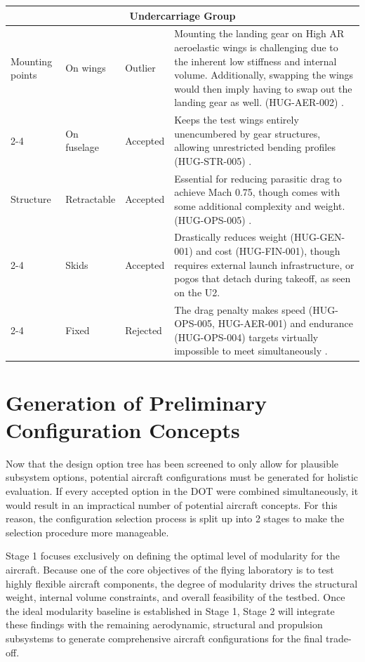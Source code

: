 \begin{longtable}{|p{1.6cm}|p{2.3cm}|p{1.6cm}|p{9.5cm}|}
\multicolumn{4}{|c|}{\textbf{Undercarriage Group}} \\
\hline
Mounting points & On wings & Outlier &  Mounting the landing gear on High AR aeroelastic wings is challenging due to the inherent low stiffness and internal volume. Additionally, swapping the wings would then imply having to swap out the landing gear as well. (HUG-AER-002) \cite{raymer1992aircraft}. \\
\cline{2-4}
\multicolumn{1}{|l|}{} & On fuselage & Accepted & Keeps the test wings entirely unencumbered by gear structures, allowing unrestricted bending profiles (HUG-STR-005) \cite{Vos}. \\
\hline
Structure & Retractable & Accepted & Essential for reducing parasitic drag to achieve Mach 0.75, though comes with some additional complexity and weight. (HUG-OPS-005) \cite{raymer1992aircraft}. \\
\cline{2-4}
\multicolumn{1}{|l|}{} & Skids & Accepted & Drastically reduces weight (HUG-GEN-001) and cost (HUG-FIN-001), though requires external launch infrastructure, or pogos that detach during takeoff, as seen on the U2. \cite{AirforceTechU2}\\
\cline{2-4}
\multicolumn{1}{|l|}{} & Fixed & Rejected & The drag penalty makes speed (HUG-OPS-005, HUG-AER-001) and endurance (HUG-OPS-004) targets virtually impossible to meet simultaneously \cite{raymer1992aircraft}. \\
\hline
\end{longtable}

\section{Generation of Preliminary Configuration Concepts}
\label{sec:prelim_config_concepts}

Now that the design option tree has been screened to only allow for plausible subsystem options, potential aircraft configurations must be generated for holistic evaluation. If every accepted option in the DOT were combined simultaneously, it would result in an impractical number of potential aircraft concepts. For this reason, the configuration selection process is split up into 2 stages to make the selection procedure more manageable. 

Stage 1 focuses exclusively on defining the optimal level of modularity for the aircraft. Because one of the core objectives of the flying laboratory is to test highly flexible aircraft components, the degree of modularity drives the structural weight, internal volume constraints, and overall feasibility of the testbed. Once the ideal modularity baseline is established in Stage 1, Stage 2 will integrate these findings with the remaining aerodynamic, structural and propulsion subsystems to generate comprehensive aircraft configurations for the final trade-off.

